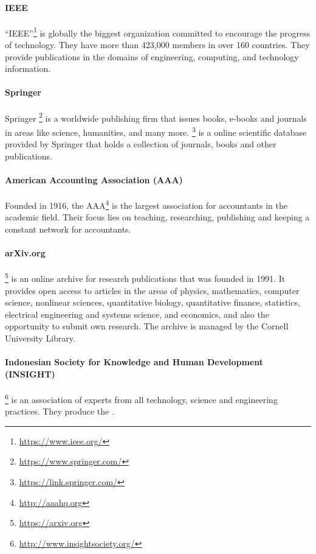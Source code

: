 \paragraph{IEEE} \enquote{IEEE}\footnote{\url{https://www.ieee.org/}} is globally the biggest organization committed to encourage the progress of technology. They have more than 423,000 members in over 160 countries. They provide publications in the domains of engineering, computing, and technology information.
\paragraph{Springer}
Springer \footnote{\url{https://www.springer.com/}} is a worldwide publishing firm that issues books, e-books and journals in areas like science, humanities, and many more.
\footnote{\url{https://link.springer.com/}} is a online scientific database provided by Springer that holds a collection of journals, books and other publications.
\paragraph{American Accounting Association (AAA)} Founded in 1916, the AAA\footnote{\url{http://aaahq.org}} is the largest association for accountants in the academic field. Their focus lies on teaching, researching, publishing and keeping a constant network for accountants.
\paragraph{arXiv.org} \footnote{\url{https://arxiv.org}} is an online archive for research publications that was founded in 1991. It provides open access to articles in the areas of physics, mathematics, computer science, nonlinear sciences, quantitative biology, quantitative finance, statistics, electrical engineering and systems science, and economics, and also the opportunity to submit own research. The archive is managed by the Cornell University Library.
\paragraph{Indonesian Society for Knowledge and Human Development (INSIGHT)} \footnote{\url{http://www.insightsociety.org/}} is an association of experts from all technology, science and engineering practices. They produce the .
